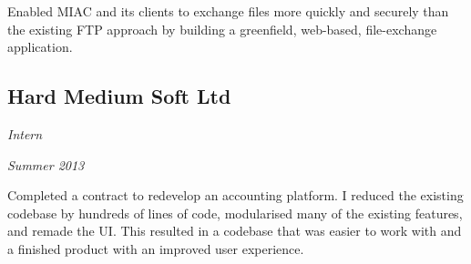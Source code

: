 Enabled MIAC and its clients to exchange files more quickly and securely than
the existing FTP approach by building a greenfield, web-based, file-exchange
application.

\subsection*{Hard Medium Soft Ltd}
\noindent\begin{minipage}[b]{0.5\textwidth}
  \flushleft
  \emph{Intern}
\end{minipage}
\noindent\begin{minipage}[b]{0.5\textwidth}
  \flushright
  \emph{Summer 2013}
\end{minipage}

Completed a contract to redevelop an accounting platform. I reduced the existing
codebase by hundreds of lines of code, modularised many of the existing
features, and remade the UI. This resulted in a codebase that was easier to work
with and a finished product with an improved user experience.

